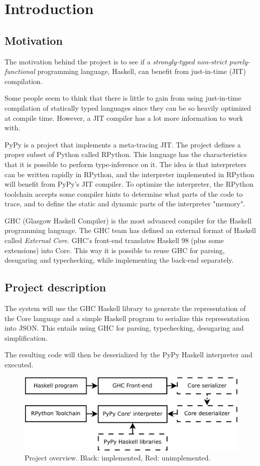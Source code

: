 
\section{Introduction}

\subsection{Motivation}

The motivation behind the project is to see if a \emph{strongly-typed} 
\emph{non-strict} \emph{purely-functional} programming language, Haskell, 
can benefit from just-in-time (JIT) compilation.

Some people seem to think that there is little to gain from using 
just-in-time compilation of statically typed languages since they can be
so heavily optimized at compile time. However, a JIT compiler has a lot
more information to work with.

PyPy is a project that implements a meta-tracing JIT. The project
defines a proper subset of Python called RPython. This language has 
the characteristics that it is possible to perform type-inference on it.
The idea is that interpreters can be written rapidly in RPython, and the
interpreter implemented in RPython will benefit from PyPy's JIT compiler.
To optimize the interpreter, the RPython toolchain accepts some compiler
hints to determine what parts of the code to trace, and to define the 
static and dynamic parts of the interpreter "memory".

GHC (Glasgow Haskell Compiler) is the most advanced compiler for the
Haskell programming language. The GHC team has defined an external format
of Haskell called \emph{External Core}. GHC's front-end translates
Haskell 98 (plus some extensions) into Core. This way it is possible to
reuse GHC for parsing, desugaring and typechecking, while implementing
the back-end separately. \cite{tolmach2010ghc}

\subsection{Project description}

The system will use the GHC Haskell library to generate the 
representation of the Core language and a simple Haskell program to 
serialize this representation into JSON. This entails using GHC for
parsing, typechecking, desugaring and simplification.

The resulting code will then be deserialized by the PyPy Haskell interpreter 
and executed. 

\begin{figure}
\includegraphics[width=\textwidth]{diags/overview}
\caption{Project overview. Black: implemented, Red: unimplemented.}
\end{figure}


